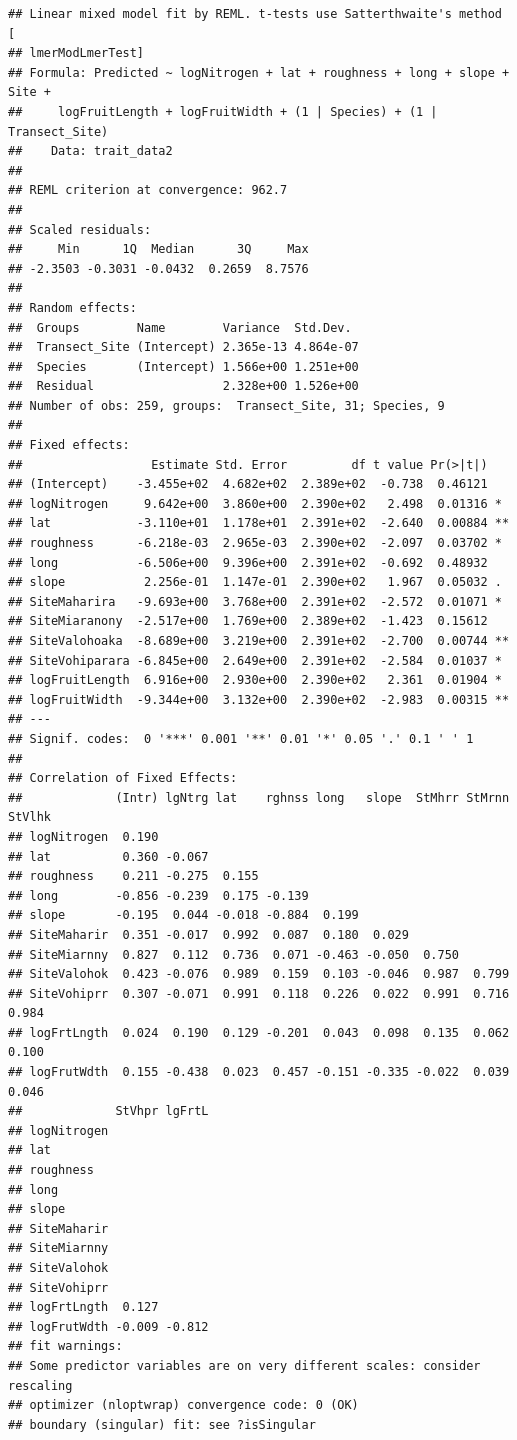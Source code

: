 \documentclass[
  12pt,
]{article}
\begin{document}
\begin{verbatim}
## Linear mixed model fit by REML. t-tests use Satterthwaite's method [
## lmerModLmerTest]
## Formula: Predicted ~ logNitrogen + lat + roughness + long + slope + Site +  
##     logFruitLength + logFruitWidth + (1 | Species) + (1 | Transect_Site)
##    Data: trait_data2
## 
## REML criterion at convergence: 962.7
## 
## Scaled residuals: 
##     Min      1Q  Median      3Q     Max 
## -2.3503 -0.3031 -0.0432  0.2659  8.7576 
## 
## Random effects:
##  Groups        Name        Variance  Std.Dev. 
##  Transect_Site (Intercept) 2.365e-13 4.864e-07
##  Species       (Intercept) 1.566e+00 1.251e+00
##  Residual                  2.328e+00 1.526e+00
## Number of obs: 259, groups:  Transect_Site, 31; Species, 9
## 
## Fixed effects:
##                  Estimate Std. Error         df t value Pr(>|t|)   
## (Intercept)    -3.455e+02  4.682e+02  2.389e+02  -0.738  0.46121   
## logNitrogen     9.642e+00  3.860e+00  2.390e+02   2.498  0.01316 * 
## lat            -3.110e+01  1.178e+01  2.391e+02  -2.640  0.00884 **
## roughness      -6.218e-03  2.965e-03  2.390e+02  -2.097  0.03702 * 
## long           -6.506e+00  9.396e+00  2.391e+02  -0.692  0.48932   
## slope           2.256e-01  1.147e-01  2.390e+02   1.967  0.05032 . 
## SiteMaharira   -9.693e+00  3.768e+00  2.391e+02  -2.572  0.01071 * 
## SiteMiaranony  -2.517e+00  1.769e+00  2.389e+02  -1.423  0.15612   
## SiteValohoaka  -8.689e+00  3.219e+00  2.391e+02  -2.700  0.00744 **
## SiteVohiparara -6.845e+00  2.649e+00  2.391e+02  -2.584  0.01037 * 
## logFruitLength  6.916e+00  2.930e+00  2.390e+02   2.361  0.01904 * 
## logFruitWidth  -9.344e+00  3.132e+00  2.390e+02  -2.983  0.00315 **
## ---
## Signif. codes:  0 '***' 0.001 '**' 0.01 '*' 0.05 '.' 0.1 ' ' 1
## 
## Correlation of Fixed Effects:
##             (Intr) lgNtrg lat    rghnss long   slope  StMhrr StMrnn StVlhk
## logNitrogen  0.190                                                        
## lat          0.360 -0.067                                                 
## roughness    0.211 -0.275  0.155                                          
## long        -0.856 -0.239  0.175 -0.139                                   
## slope       -0.195  0.044 -0.018 -0.884  0.199                            
## SiteMaharir  0.351 -0.017  0.992  0.087  0.180  0.029                     
## SiteMiarnny  0.827  0.112  0.736  0.071 -0.463 -0.050  0.750              
## SiteValohok  0.423 -0.076  0.989  0.159  0.103 -0.046  0.987  0.799       
## SiteVohiprr  0.307 -0.071  0.991  0.118  0.226  0.022  0.991  0.716  0.984
## logFrtLngth  0.024  0.190  0.129 -0.201  0.043  0.098  0.135  0.062  0.100
## logFrutWdth  0.155 -0.438  0.023  0.457 -0.151 -0.335 -0.022  0.039  0.046
##             StVhpr lgFrtL
## logNitrogen              
## lat                      
## roughness                
## long                     
## slope                    
## SiteMaharir              
## SiteMiarnny              
## SiteValohok              
## SiteVohiprr              
## logFrtLngth  0.127       
## logFrutWdth -0.009 -0.812
## fit warnings:
## Some predictor variables are on very different scales: consider rescaling
## optimizer (nloptwrap) convergence code: 0 (OK)
## boundary (singular) fit: see ?isSingular
\end{verbatim}
\end{document}
